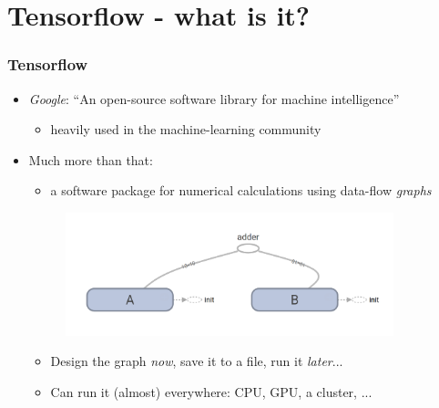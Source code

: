 \documentclass{beamer}
\begin{document}
\section{Tensorflow - what is it?}
\begin{frame}
\frametitle{Tensorflow}
\begin{itemize}
  \item \textsl{Google}: ``An open-source software library for machine intelligence''
    \begin{itemize}
      \item heavily used in the machine-learning community
    \end{itemize}
    \pause
  \item Much more than that:
    \begin{itemize}
      \item a software package for numerical calculations using data-flow \textsl{graphs}
    \end{itemize}
    \pause
    \begin{figure}
      \centering
      \includegraphics[width = 0.9\textwidth]{../ExampleGraph.png}
    \end{figure}
    \pause
    \begin{itemize}
      \item Design the graph \textsl{now}, save it to a file, run it \textsl{later}...
      \item Can run it (almost) everywhere: CPU, GPU, a cluster, ...
    \end{itemize}
\end{itemize}
\end{frame}
\end{document}
